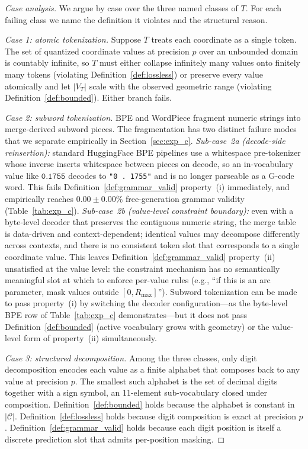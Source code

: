 \documentclass[11pt]{article}
\begin{document}
\begin{proof}[Case analysis]
We argue by case over the three named classes of $T$. For each failing class we name the definition it violates and the structural reason.

\smallskip\noindent\textit{Case 1: atomic tokenization.} Suppose $T$ treats each coordinate as a single token. The set of quantized coordinate values at precision $p$ over an unbounded domain is countably infinite, so $T$ must either collapse infinitely many values onto finitely many tokens (violating Definition~\ref{def:lossless}) or preserve every value atomically and let $|V_T|$ scale with the observed geometric range (violating Definition~\ref{def:bounded}). Either branch fails.

\smallskip\noindent\textit{Case 2: subword tokenization.} BPE and WordPiece fragment numeric strings into merge-derived subword pieces. The fragmentation has two distinct failure modes that we separate empirically in Section~\ref{sec:exp_c}. \emph{Sub-case~2a (decode-side reinsertion):} standard HuggingFace BPE pipelines use a whitespace pre-tokenizer whose inverse inserts whitespace between pieces on decode, so an in-vocabulary value like $\texttt{0.1755}$ decodes to \texttt{"0 . 1755"} and is no longer parseable as a G-code word. This fails Definition~\ref{def:grammar_valid} property~(i) immediately, and empirically reaches $0.00 \pm 0.00\%$ free-generation grammar validity (Table~\ref{tab:exp_c}). \emph{Sub-case~2b (value-level constraint boundary):} even with a byte-level decoder that preserves the contiguous numeric string, the merge table is data-driven and context-dependent; identical values may decompose differently across contexts, and there is no consistent token slot that corresponds to a single coordinate value. This leaves Definition~\ref{def:grammar_valid} property~(ii) unsatisfied at the value level: the constraint mechanism has no semantically meaningful slot at which to enforce per-value rules (e.g., ``if this is an arc parameter, mask values outside $[0, R_{\max}]$''). Subword tokenization can be made to pass property~(i) by switching the decoder configuration---as the byte-level BPE row of Table~\ref{tab:exp_c} demonstrates---but it does not pass Definition~\ref{def:bounded} (active vocabulary grows with geometry) or the value-level form of property~(ii) simultaneously.

\smallskip\noindent\textit{Case 3: structured decomposition.} Among the three classes, only digit decomposition encodes each value as a finite alphabet that composes back to any value at precision $p$. The smallest such alphabet is the set of decimal digits together with a sign symbol, an 11-element sub-vocabulary closed under composition. Definition~\ref{def:bounded} holds because the alphabet is constant in $|\mathcal{C}|$. Definition~\ref{def:lossless} holds because digit composition is exact at precision $p$. Definition~\ref{def:grammar_valid} holds because each digit position is itself a discrete prediction slot that admits per-position masking.
\end{proof}
\end{document}
